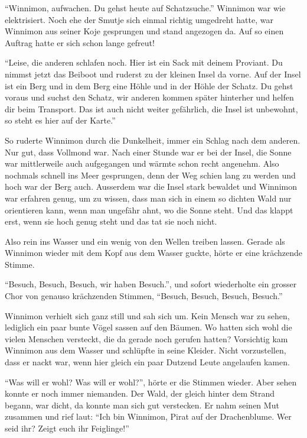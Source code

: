 \enquote{Winnimon, aufwachen. Du gehst heute auf Schatzsuche.} Winnimon war wie elektrisiert. Noch ehe der Smutje sich einmal richtig umgedreht hatte, war Winnimon aus seiner Koje gesprungen und stand angezogen da. Auf so einen Auftrag hatte er sich schon lange gefreut!

\enquote{Leise, die anderen schlafen noch. Hier ist ein Sack mit deinem Proviant. Du nimmst jetzt das Beiboot und ruderst zu der kleinen Insel da vorne. Auf der Insel ist ein Berg und in dem Berg eine Höhle und in der Höhle der Schatz. Du gehst voraus und suchst den Schatz, wir anderen kommen später hinterher und helfen dir beim Transport. Das ist auch nicht weiter gefährlich, die Insel ist unbewohnt, so steht es hier auf der Karte.}

So ruderte Winnimon durch die Dunkelheit, immer ein Schlag nach dem anderen.
Nur gut, dass Vollmond war. Nach einer Stunde war er bei der Insel, die Sonne
war mittlerweile auch aufgegangen und wärmte schon recht angenehm. Also
nochmals schnell ins Meer gesprungen, denn der Weg schien lang zu werden und
hoch war der Berg auch. Ausserdem war die Insel stark bewaldet und Winnimon war erfahren genug, um zu wissen, dass man sich in einem so dichten Wald nur orientieren kann, wenn man ungefähr ahnt, wo die Sonne steht. Und das klappt erst, wenn sie hoch genug steht und das tat sie noch nicht.

Also rein ins Wasser und ein wenig von den Wellen treiben lassen. Gerade als
Winnimon wieder mit dem Kopf aus dem Wasser guckte, hörte er eine krächzende Stimme.

\enquote{Besuch, Besuch, Besuch, wir haben Besuch.}, und sofort wiederholte ein grosser Chor von genauso krächzenden Stimmen, \enquote{Besuch, Besuch, Besuch, Besuch.}

Winnimon verhielt sich ganz still und sah sich um. Kein Mensch war zu sehen, lediglich ein paar bunte Vögel sassen auf den Bäumen. Wo hatten sich wohl die vielen Menschen versteckt, die da gerade noch gerufen hatten? Vorsichtig kam Winnimon aus dem Wasser und schlüpfte in seine Kleider. Nicht vorzustellen, dass er nackt war, wenn hier gleich ein paar Dutzend Leute angelaufen kamen.

\enquote{Was will er wohl? Was will er wohl?}, hörte er die Stimmen wieder. Aber sehen konnte er noch immer niemanden. Der Wald, der gleich hinter dem Strand begann, war dicht, da konnte man sich gut verstecken. Er nahm seinen Mut zusammen und rief laut: \enquote{Ich bin Winnimon, Pirat auf der Drachenblume. Wer seid ihr? Zeigt euch ihr Feiglinge!}

